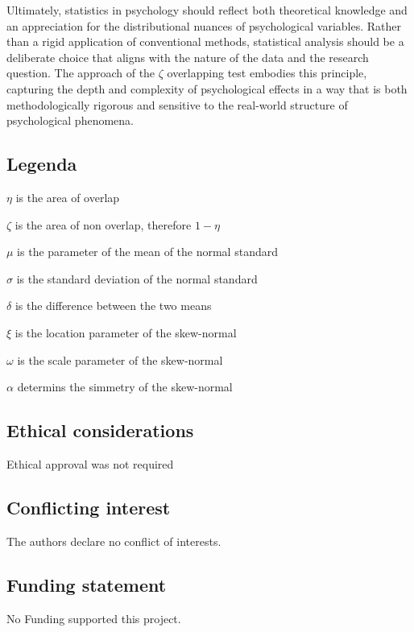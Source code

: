 \documentclass[twocolumn]{article}\usepackage[]{graphicx}\usepackage[]{xcolor}
\begin{document}
Ultimately, statistics in psychology should reflect both theoretical knowledge and an appreciation for the distributional nuances of psychological variables. Rather than a rigid application of conventional methods, statistical analysis should be a deliberate choice that aligns with the nature of the data and the research question. The approach of the $\zeta$ overlapping test embodies this principle, capturing the depth and complexity of psychological effects in a way that is both methodologically rigorous and sensitive to the real-world structure of psychological phenomena.

\subsection*{Legenda}

$\eta$ is the area of overlap

\noindent $\zeta$ is the area of non overlap, therefore $1 - \eta$

\noindent $\mu$ is the parameter of the mean of the normal standard 

\noindent $\sigma$ is the standard deviation of the normal standard

\noindent $\delta$ is the difference between the two means

\noindent $\xi$ is the location parameter of the skew-normal

\noindent $\omega$ is the scale parameter of the skew-normal

\noindent $\alpha$ determins the simmetry of the skew-normal


\subsection*{Ethical considerations}
Ethical approval was not required

\subsection*{Conflicting interest}
The authors declare no conflict of interests.

\subsection*{Funding statement}
No Funding supported this project.



\end{document}
